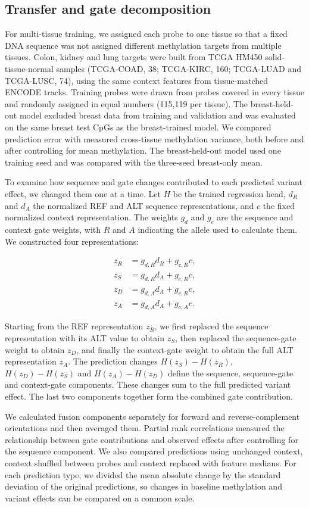 \documentclass[11pt,letterpaper]{article}
\begin{document}
\subsection{Transfer and gate decomposition}
For multi-tissue training, we assigned each probe to one tissue so that a fixed DNA sequence was not assigned different methylation targets from multiple tissues. Colon, kidney and lung targets were built from TCGA HM450 solid-tissue-normal samples (TCGA-COAD, 38; TCGA-KIRC, 160; TCGA-LUAD and TCGA-LUSC, 74), using the same context features from tissue-matched ENCODE tracks. Training probes were drawn from probes covered in every tissue and randomly assigned in equal numbers (115,119 per tissue). The breast-held-out model excluded breast data from training and validation and was evaluated on the same breast test CpGs as the breast-trained model. We compared prediction error with measured cross-tissue methylation variance, both before and after controlling for mean methylation. The breast-held-out model used one training seed and was compared with the three-seed breast-only mean. 

To examine how sequence and gate changes contributed to each predicted variant effect, we changed them one at a time. Let $H$ be the trained regression head, $d_R$ and $d_A$ the normalized REF and ALT sequence representations, and $c$ the fixed normalized context representation. The weights $g_d$ and $g_c$ are the sequence and context gate weights, with $R$ and $A$ indicating the allele used to calculate them. We constructed four representations:

\begin{align*} z_R&=g_{d,R}d_R+g_{c,R}c,\\ z_S&=g_{d,R}d_A+g_{c,R}c,\\ z_D&=g_{d,A}d_A+g_{c,R}c,\\ z_A&=g_{d,A}d_A+g_{c,A}c. \end{align*}

Starting from the REF representation $z_R$, we first replaced the sequence representation with its ALT value to obtain $z_S$, then replaced the sequence-gate weight to obtain $z_D$, and finally the context-gate weight to obtain the full ALT representation $z_A$. The prediction changes $H(z_S)-H(z_R)$, $H(z_D)-H(z_S)$ and $H(z_A)-H(z_D)$ define the sequence, sequence-gate and context-gate components. These changes sum to the full predicted variant effect. The last two components together form the combined gate contribution.

We calculated fusion components separately for forward and reverse-complement orientations and then averaged them. Partial rank correlations measured the relationship between gate contributions and observed effects after controlling for the sequence component. We also compared predictions using unchanged context, context shuffled between probes and context replaced with feature medians. For each prediction type, we divided the mean absolute change by the standard deviation of the original predictions, so changes in baseline methylation and variant effects can be compared on a common scale. 
\end{document}
